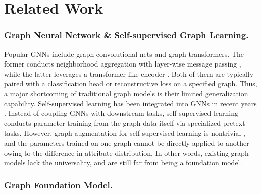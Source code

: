 \section{Related Work}
\vspace{-0.03in}
\subsubsection*{\textbf{Graph Neural Network \& Self-supervised Graph Learning.}}
Popular GNNs include graph convolutional nets and graph transformers.
The former conducts neighborhood aggregation with layer-wise message passing \cite{icml19sgc,nips16cnn,nips17GraphSAGE}, while the latter leverages a transformer-like encoder \cite{arxiv22Gransformer}.
Both of them are typically paired with a classification head or reconstructive loss on a specified graph.
Thus, a major shortcoming of traditional graph models is their limited generalization capability.
Self-supervised learning has been integrated into GNNs in recent years \cite{www23graphmae2,iclr19dgi}.
Instead of coupling GNNs with downstream tasks, self-supervised learning conducts parameter training from the graph data itself via specialized pretext tasks. 
However, graph augmentation for self-supervised learning is nontrivial \cite{www2GraphAugmentation,arxiv24GraphContrastiveSurvey}, and the parameters trained on one graph cannot be directly applied to another owing to the difference in attribute distribution.
In other words, existing graph models lack the universality, and are still far from being a foundation model.

  \vspace{-0.05in}
\subsubsection*{\textbf{Graph Foundation Model.}}


